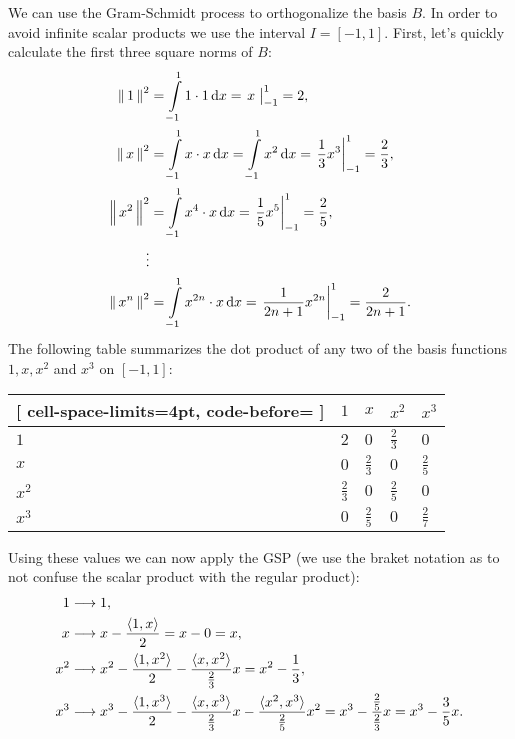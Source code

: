 We can use the Gram-Schmidt process to orthogonalize the basis $B$. In order to avoid infinite scalar products we use the interval $I=[-1,1]$. First, let's quickly calculate the first three square norms of $B$:
\begin{align*}
	\gnorm{1}^{2} &= \int\limits_{-1}^{1}1\cdot1\dif x = \left.x\phantom{\mid}\right|_{-1}^{1} = 2,\\
	\gnorm{x}^{2} &= \int\limits_{-1}^{1}x\cdot x\dif x = \int\limits_{-1}^{1}x^{2}\dif x = \left.\frac{1}{3}x^{3}\right|_{-1}^{1} = \frac{2}{3},\\
	\gnorm{x^{2}}^{2} &= \int\limits_{-1}^{1}x^{4}\cdot x\dif x = \left.\frac{1}{5}x^{5}\right|_{-1}^{1} = \frac{2}{5},\\
	\vdots\\
	\gnorm{x^{n}}^{2} &= \int\limits_{-1}^{1}x^{2n}\cdot x\dif x = \left.\frac{1}{2n+1}x^{2n}\right|_{-1}^{1} = \frac{2}{2n+1}.
\end{align*}
The following table summarizes the dot product of any two of the basis functions $1,x,x^{2}$ and $x^{3}$ on $[-1,1]$:

\begin{center}
	\begin{NiceTabular}{>{}l|llll}[
		cell-space-limits=4pt, code-before= 
		]
		\toprule
		\RowStyle{\bfseries}& $1$ & $x$ & $x^{2}$ & $x^{3}$\\
		\midrule
		$1$ &   $2$ & $0$ & $\frac{2}{3}$ & $0$ \\
		$x$ &   $0$ & $\frac{2}{3}$ & $0$ & $\frac{2}{5}$ \\
		$x^{2}$ & $\frac{2}{3}$ & $0$ & $\frac{2}{5}$ & $0$ \\
		$x^{3}$ & $0$ & $\frac{2}{5}$ & $0$ & $\frac{2}{7}$ \\
		\bottomrule
	\end{NiceTabular}
\end{center}

Using these values we can now apply the GSP (we use the braket notation as to not confuse the scalar product with the regular product):
\begin{align*}
	1 &\longrightarrow 1,\\
	x &\longrightarrow x - \frac{\langle 1,x \rangle}{2} = x-0 = x,\\
	x^{2} &\longrightarrow x^{2} - \frac{\langle 1,x^{2} \rangle}{2} - \frac{\langle x,x^{2} \rangle}{\frac{2}{3}}x = x^{2}-\frac{1}{3},\\
	x^{3} &\longrightarrow x^{3} - \frac{\langle 1,x^{3} \rangle}{2} - \frac{\langle x,x^{3} \rangle}{\frac{2}{3}}x - \frac{\langle x^{2},x^{3} \rangle}{\frac{2}{5}}x^{2} = x^{3}-\frac{\frac{2}{5}}{\frac{2}{3}}x = x^{3} - \frac{3}{5}x.
\end{align*}

